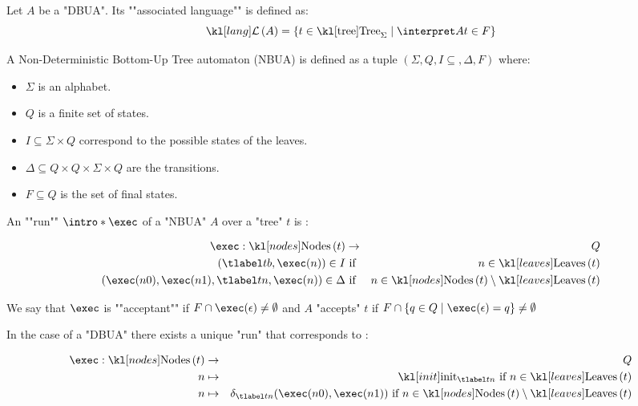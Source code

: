\documentclass{article}
\begin{document}
\begin{definition}
	Let $A$ be a "DBUA". Its ""associated language"" is defined as:
	\[\lang A = \setdef {t \in \tree_{\Sigma}} {\interpret A t \in F}\]
\end{definition}

\begin{definition}
	A Non-Deterministic Bottom-Up Tree automaton (NBUA) is defined as a tuple
	$(\Sigma, Q, I \subseteq, \Delta , F )$ where:
	\begin{itemize}
		\item $\Sigma$ is an alphabet.
		\item $Q$ is a finite set of states.
		\item $I \subseteq \Sigma \times Q$ correspond to the possible states of the leaves.
		\item $\Delta \subseteq Q \times Q \times \Sigma \times Q$ are the transitions.
		\item $F \subseteq Q$ is the set of final states.
	\end{itemize}
\end{definition}


\begin{definition}
	An ""run"" $\intro* \exec$ of a "NBUA" $A$ over a "tree" $t$ is :

	\begin{eqnarray*}
		\exec : \nodes t &\to& Q \\
		(\tlabel t b,  \exec (n) ) \in I &\text{ if }& n \in \leaves t \\
		(\exec (n0), \exec (n1), \tlabel t n, \exec (n)) \in \Delta &\text{ if }& n \in \nodes t \setminus \leaves t
	\end{eqnarray*}

	We say that $\exec$ is ""acceptant"" if $F \cap \exec (\epsilon) \neq \emptyset$ and $A$ "accepts" $t$ if
	$F \cap \setdef { q\in Q} {\exec (\epsilon) = q} \neq \emptyset$
\end{definition}

\begin{remark}
	In the case of a "DBUA" there exists a unique "run" that corresponds to :

	\begin{eqnarray*}
		\exec : \nodes t &\to & Q \\
		n  &\mapsto& \init_{\tlabel t n} \text{ if } n \in \leaves t \\
		n  &\mapsto& \delta_{\tlabel t n}(\exec (n0), \exec (n1)) \text{ if } n \in \nodes t \setminus \leaves t
	\end{eqnarray*}
\end{remark}
\end{document}
